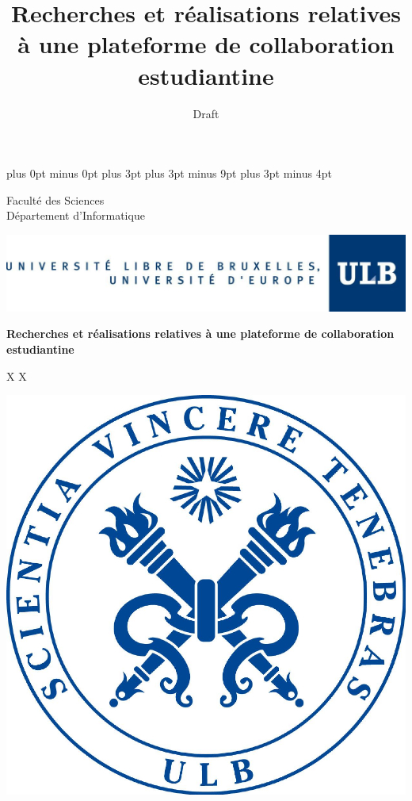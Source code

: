 \documentclass[a4paper,12pt]{article}
\title{Recherches et réalisations relatives à une plateforme de
       collaboration estudiantine}
\author{Draft}
\begin{document}
\abovedisplayskip=1pt plus 0pt minus 0pt
\abovedisplayshortskip=6pt plus 3pt
\belowdisplayskip=9pt plus 3pt minus 9pt
\belowdisplayshortskip=9pt plus 3pt minus 4pt

\setlength{\voffset}{-20pt}

\begin{titlepage}
\begin{center}

\begin{minipage}{2in}
	\begin{flushleft}
		\textsf{\small{
		Faculté des Sciences\\
		Département d'Informatique}}
	\end{flushleft}
\end{minipage}
\begin{minipage}{4in}
	\begin{flushright}
		\includegraphics[scale=0.20]{imgs/ulb2.pdf}
	\end{flushright}
\end{minipage}

\vspace{120pt}

{\Large \bfseries Recherches et réalisations relatives à une plateforme de
       collaboration estudiantine}

\vspace{20pt}

\large{X \textsc{X}}

\vspace{90pt}

\includegraphics[scale=0.6]{imgs/ulb1.pdf}
\end{center}
\end{titlepage}
\end{document}

